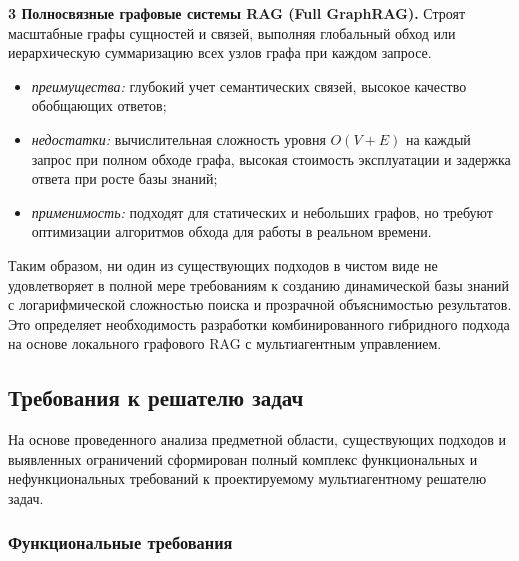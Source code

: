     \textbf{3 Полносвязные графовые системы RAG (Full GraphRAG).}
    Строят масштабные графы сущностей и связей, выполняя глобальный обход или иерархическую суммаризацию всех узлов графа при каждом запросе.
    \begin{itemize}
        \item \textit{преимущества:} глубокий учет семантических связей, высокое качество обобщающих ответов;
        \item \textit{недостатки:} вычислительная сложность уровня $O(V+E)$ на каждый запрос при полном обходе графа, высокая стоимость эксплуатации и задержка ответа при росте базы знаний;
        \item \textit{применимость:} подходят для статических и небольших графов, но требуют оптимизации алгоритмов обхода для работы в реальном времени.
    \end{itemize}


Таким образом, ни один из существующих подходов в чистом виде не удовлетворяет в полной мере требованиям к созданию динамической базы знаний с логарифмической сложностью поиска и прозрачной объяснимостью результатов. Это определяет необходимость разработки комбинированного гибридного подхода на основе локального графового RAG с мультиагентным управлением.


\subsection{Требования к решателю задач}
%

На основе проведенного анализа предметной области, существующих подходов и выявленных ограничений сформирован полный комплекс функциональных и нефункциональных требований к проектируемому мультиагентному решателю задач.

\subsubsection{Функциональные требования}


